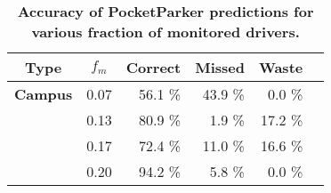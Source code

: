 \begin{table}[t!]
\begin{threeparttable}
{\small
\begin{tabularx}{\columnwidth}{Xrrrrr}
\multicolumn{1}{c}{\textbf{Type}} & 
\multicolumn{1}{c}{\textbf{$f_m$}} & 
\multicolumn{1}{c}{\textbf{Correct}} & 
\multicolumn{1}{c}{\textbf{Missed}} & 
\multicolumn{1}{c}{\textbf{Waste}}\\ \toprule

\textbf{Campus} & 0.07 & 56.1 \% & 43.9 \% & 0.0 \% \\
& 0.13 & 80.9 \% & 1.9 \% & 17.2 \% \\
& 0.17 & 72.4 \% & 11.0 \% & 16.6 \% \\
& 0.20 & 94.2 \% & 5.8 \% & 0.0 \% \\
\end{tabularx}
}
\caption{\textbf{Accuracy of PocketParker predictions for various fraction of monitored drivers.}}
\label{table-accuracy}
\end{threeparttable}
\end{table}
